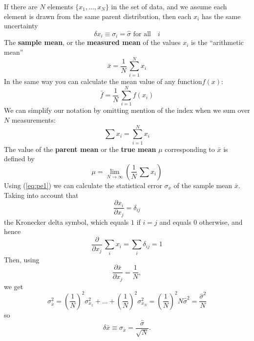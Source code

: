 \documentclass[12pt]{article}
\begin{document}
\noindent If there are $N$ elements $\{x_1,\ldots,x_N\}$  in the set of data, and we assume each
    element is drawn from the same parent distribution, then each $x_i$ has the same uncertainty 
\begin{equation}
  \delta x_i  \equiv \sigma_i = \hat{\sigma} \text{ for all} \quad  i
\end{equation}
The \textbf{sample mean}, or the \textbf{measured mean} of the values $x_i$ is
  the ``arithmetic mean''
\begin{equation}  \label{eq:mv1}
  \bar{x} = \frac{1}{N}\,\sum_{i = 1}^N x_i
\end{equation}
In the same way you can calculate the mean value of any function$f(x)$:
\begin{equation}
 \bar{f} = \frac{1}{N}\,\sum_{i = 1}^N f(x_i)
\end{equation}
We can simplify our notation by omitting mention of the index when we sum
  over $N$ measurements:
\begin{equation}
  \sum x_i =  \sum_{i = 1}^N x_i
\end{equation}
The value of the \textbf{parent mean} or the \textbf{true mean} $\mu$ corresponding to $\bar{x}$ is defined by
\begin{equation}  \label{eq:mv2}
  \mu = \lim_{N \rightarrow \infty} \left( \frac{1}{N}\,\sum x_i \right)
\end{equation}
Using (\ref{eq:pe1}) we can calculate the statistical error $\sigma_{\bar{x}}$ of the sample mean $\bar{x}$.
Taking into account that 
\begin{equation}
 \frac{\partial x_i}{\partial x_j} = \delta_{i j}
\end{equation}
  the Kronecker delta symbol, which equals $1$ if $i=j$ and equals $0$ otherwise, and hence
\begin{equation}
  \frac{ \partial }{\partial x_j} \, \sum_i  x_i = \sum_i \delta_{i j} = 1
\end{equation}  
  Then, using
\begin{equation}
  \frac{\partial \bar{x}}{\partial x_j} = \frac{1}{N},
\end{equation}  
   we get
\begin{equation}
  \sigma_{\bar{x}}^2 = \left( \frac{1}{N} \right)^2 \sigma_{x_1}^2 + \ldots + \left( \frac{1}{N} \right)^2 \sigma_{x_N}^2 =
                 \left( \frac{1}{N} \right)^2 N \hat{\sigma}^2 = \frac{\hat{\sigma}^2}{N}
\end{equation}   
  so
\begin{equation}   \label{eq:mv2a}
  \delta \bar{x} \equiv \sigma_{ \bar{x}} = \frac{\hat{\sigma}}{\sqrt{N}}.
\end{equation}  
\end{document}
